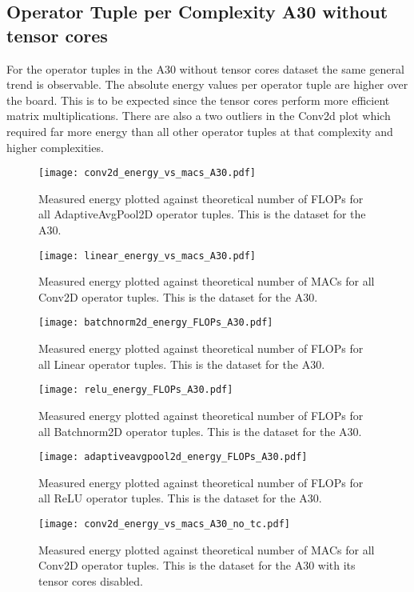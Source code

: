 \documentclass[conference]{IEEEtran}
\begin{document}
\subsection{Operator Tuple per Complexity A30 without tensor cores}
For the operator tuples in the A30 without tensor cores dataset the same general trend is observable. The absolute energy values per operator tuple are higher over the board. This is to be expected since the tensor cores perform more efficient matrix multiplications. There are also a two outliers in the Conv2d plot which required far more energy than all other operator tuples at that complexity and higher complexities.


\begin{figure}
    \texttt{[image: conv2d\_energy\_vs\_macs\_A30.pdf]}
    \caption{Measured energy plotted against theoretical number of FLOPs for all AdaptiveAvgPool2D operator tuples. This is the dataset for the A30.}
    \label{fig:adavgpool2da30notc}
    \texttt{[image: linear\_energy\_vs\_macs\_A30.pdf]}
    \caption{Measured energy plotted against theoretical number of MACs for all Conv2D operator tuples. This is the dataset for the A30.}
    \label{fig:conv2da30notc}
\end{figure}



\begin{figure}
    \texttt{[image: batchnorm2d\_energy\_FLOPs\_A30.pdf]}
    \caption{Measured energy plotted against theoretical number of FLOPs for all Linear operator tuples. This is the dataset for the A30.}
    \label{fig:lina30notc}
    \texttt{[image: relu\_energy\_FLOPs\_A30.pdf]}
    \caption{Measured energy plotted against theoretical number of FLOPs for all Batchnorm2D operator tuples. This is the dataset for the A30.}
    \label{fig:batchnorm2da30notc}
\end{figure}


\begin{figure}
    \texttt{[image: adaptiveavgpool2d\_energy\_FLOPs\_A30.pdf]}
    \caption{Measured energy plotted against theoretical number of FLOPs for all ReLU operator tuples. This is the dataset for the A30.}
    \label{fig:relua30notc}
    \texttt{[image: conv2d\_energy\_vs\_macs\_A30\_no\_tc.pdf]}
    \caption{Measured energy plotted against theoretical number of MACs for all Conv2D operator tuples. This is the dataset for the A30 with its tensor cores disabled.}
    \label{fig:conv2da30notc}
\end{figure}
\end{document}
